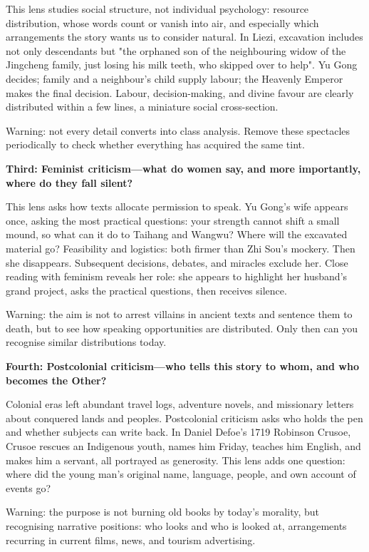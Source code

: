 This lens studies social structure, not individual psychology: resource distribution, whose words count or vanish into air, and especially which arrangements the story wants us to consider natural. In Liezi, excavation includes not only descendants but "the orphaned son of the neighbouring widow of the Jingcheng family, just losing his milk teeth, who skipped over to help". Yu Gong decides; family and a neighbour's child supply labour; the Heavenly Emperor makes the final decision. Labour, decision-making, and divine favour are clearly distributed within a few lines, a miniature social cross-section.

Warning: not every detail converts into class analysis. Remove these spectacles periodically to check whether everything has acquired the same tint.

\textbf{Third: Feminist criticism---what do women say, and more importantly, where do they fall silent?}

This lens asks how texts allocate permission to speak. Yu Gong's wife appears once, asking the most practical questions: your strength cannot shift a small mound, so what can it do to Taihang and Wangwu? Where will the excavated material go? Feasibility and logistics: both firmer than Zhi Sou's mockery. Then she disappears. Subsequent decisions, debates, and miracles exclude her. Close reading with feminism reveals her role: she appears to highlight her husband's grand project, asks the practical questions, then receives silence.

Warning: the aim is not to arrest villains in ancient texts and sentence them to death, but to see how speaking opportunities are distributed. Only then can you recognise similar distributions today.

\textbf{Fourth: Postcolonial criticism---who tells this story to whom, and who becomes the Other?}

Colonial eras left abundant travel logs, adventure novels, and missionary letters about conquered lands and peoples. Postcolonial criticism asks who holds the pen and whether subjects can write back. In Daniel Defoe's 1719 Robinson Crusoe, Crusoe rescues an Indigenous youth, names him Friday, teaches him English, and makes him a servant, all portrayed as generosity. This lens adds one question: where did the young man's original name, language, people, and own account of events go?

Warning: the purpose is not burning old books by today's morality, but recognising narrative positions: who looks and who is looked at, arrangements recurring in current films, news, and tourism advertising.

